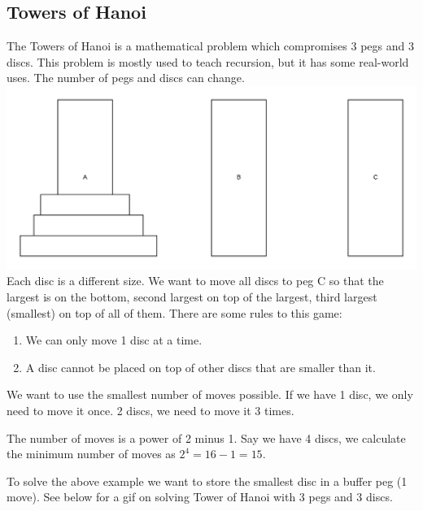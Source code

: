 \documentclass{article}
\begin{document}
\subsection{Towers of Hanoi}
The Towers of Hanoi is a mathematical problem which compromises 3 pegs and 3 discs. This problem is mostly used to teach recursion, but it has some real-world uses. The number of pegs and discs can change.
\includegraphics[width=\textwidth,height=\textheight,keepaspectratio]{images/frame_0_delay-1s.png}
Each disc is a different size. We want to move all discs to peg C so that the largest is on the bottom, second largest on top of the largest, third largest (smallest) on top of all of them. There are some rules to this game:
\begin{enumerate}
    \item We can only move 1 disc at a time.
    \item A disc cannot be placed on top of other discs that are smaller than it.
\end{enumerate}
We want to use the smallest number of moves possible. If we have 1 disc, we only need to move it once. 2 discs, we need to move it 3 times.

The number of moves is a power of 2 minus 1. Say we have 4 discs, we calculate the minimum number of moves as $2^4 = 16 - 1 = 15$. 

To solve the above example we want to store the smallest disc in a buffer peg (1 move). See below for a gif on solving Tower of Hanoi with 3 pegs and 3 discs.
\end{document}
